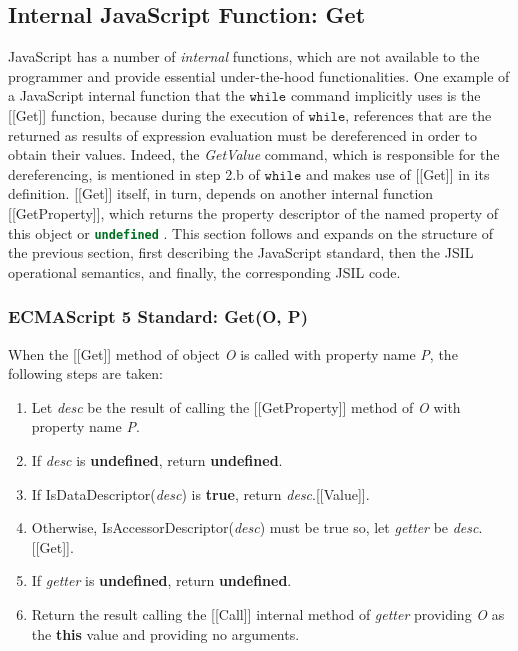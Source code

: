 \documentclass[a4paper,11pt,twoside]{report}
\def\jsinline{\lstinline[language=JavaScript, basicstyle=\small]}
\begin{document}
\subsection{Internal JavaScript Function: Get}\label{sec:get}
JavaScript has a number of {\em internal} functions, which are not available to the programmer and provide essential under-the-hood functionalities. One example of a JavaScript internal function that the $\mathtt{while}$ command implicitly uses is the [[Get]] function, because during the execution of $\mathtt{while}$, references that are the returned as results of expression evaluation must be dereferenced in order to obtain their values. Indeed, the \textit{GetValue} command, which is responsible for the dereferencing, is mentioned in step 2.b of $\mathtt{while}$ and makes use of [[Get]] in its definition. [[Get]] itself, in turn, depends on another internal function [[GetProperty]], which returns the property descriptor of the named property of this object or \jsinline|undefined| \cite{EcmaScript}. This section follows and expands on the structure of the previous section, first describing the JavaScript standard, then the JSIL operational semantics, and finally, the corresponding JSIL code.

\subsubsection{ECMAScript 5 Standard: Get(O, P)}\label{sec:getstandard}
When the [[Get]] method of object \textit{O} is called with property name \textit{P}, the following steps are taken:
\begin{enumerate}
\setlength{\itemsep}{0pt}
\item Let \textit{desc} be the result of calling the [[GetProperty]] method of \textit{O} with property name \textit{P}.
\item If \textit{desc} is \textbf{undefined}, return \textbf{undefined}.
\item If IsDataDescriptor(\textit{desc}) is \textbf{true}, return \textit{desc}.[[Value]].
\item Otherwise, IsAccessorDescriptor(\textit{desc}) must be true so, let \textit{getter} be \textit{desc}.[[Get]].
\item If \textit{getter} is \textbf{undefined}, return \textbf{undefined}.
\item Return the result calling the [[Call]] internal method of \textit{getter} providing \textit{O} as the \textbf{this} value and providing no arguments.
\end{enumerate}
\end{document}
